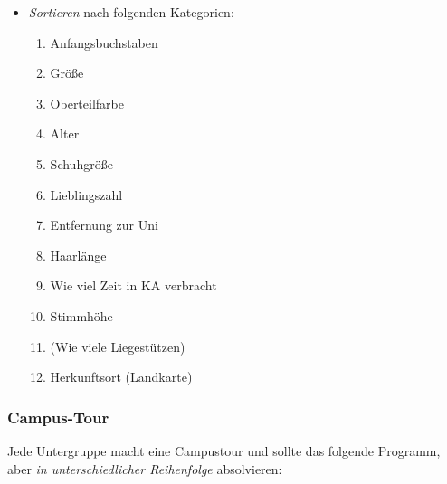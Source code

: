 \documentclass[10pt,ngerman]{scrartcl}
\begin{document}
\begin{multicols}{2}
\begin{itemize}
    \item \emph{Sortieren} nach folgenden Kategorien:
        \begin{enumerate}
            \item Anfangsbuchstaben
            \item Größe
            \item Oberteilfarbe
            \item Alter
            \item Schuhgröße
            \item Lieblingszahl
            \item Entfernung zur Uni
            \item Haarlänge
            \item Wie viel Zeit in KA verbracht
            \item Stimmhöhe
            \item (Wie viele Liegestützen)
            \item Herkunftsort (Landkarte)
        \end{enumerate}
\end{itemize}


\subsubsection{Campus-Tour}

Jede Untergruppe macht eine Campustour und sollte das folgende Programm, aber
\emph{in unterschiedlicher Reihenfolge} absolvieren:


\end{multicols}
\end{document}
